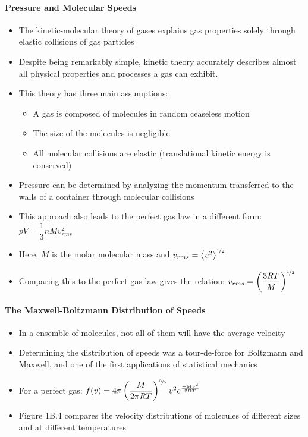 \documentclass[12pt, openany, letterpaper]{memoir}
\begin{document}
\paragraph{Pressure and Molecular Speeds}
\begin{itemize}
	\item The kinetic-molecular theory of gases explains gas properties solely through elastic collisions of gas particles
	\item Despite being remarkably simple, kinetic theory accurately describes almost all physical properties and processes a gas can exhibit.
	\item This theory has three main assumptions:
	\begin{itemize}
		\item A gas is composed of molecules in random ceaseless motion
		\item The size of the molecules is negligible
		\item All molecular collisions are elastic (translational kinetic energy is conserved)
	\end{itemize}
	\item Pressure can be determined by analyzing the momentum transferred to the walls of a container through molecular collisions
	\item This approach also leads to the perfect gas law in a different form: $pV=\dfrac{1}{3}nMv_{rms}^2$
	\item Here, $M$ is the molar molecular mass and $v_{rms}=\left< v^2 \right>^{\nicefrac{1}{2}}$
	\item Comparing this to the perfect gas law gives the relation: $v_{rms}=\left(\dfrac{3RT}{M}\right)^{\nicefrac{1}{2}}$	
\end{itemize}
\paragraph{The Maxwell-Boltzmann Distribution of Speeds}
\begin{itemize}
	\item In a ensemble of molecules, not all of them will have the average velocity
	\item Determining the distribution of speeds was a tour-de-force for Boltzmann and Maxwell, and one of the first applications of statistical mechanics
	\item For a perfect gas: $f(v) = 4\pi\left(\dfrac{M}{2\pi RT}\right)^{\nicefrac{3}{2}}v^2e^{\frac{-Mv^2}{2RT}}$
	\item Figure 1B.4 compares the velocity distributions of molecules of different sizes and at different temperatures
\end{itemize}
\end{document}
